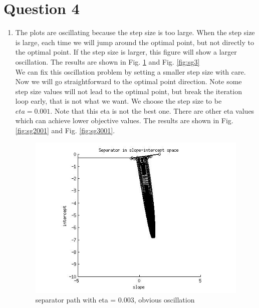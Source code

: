 \documentclass[paper=a4, fontsize=15pt]{article} %
\begin{document}
\section*{Question 4}

\begin{enumerate}
\item The plots are oscillating because the step size is too large. When the step size is large, each time we will jump around the optimal point, but not directly to the optimal point. If the step size is larger, this figure will show a larger oscillation.
The results are shown in Fig. \ref{fig:sg2} and Fig. \ref{fig:sg3}\\
We can fix this oscillation problem by setting a smaller step size with care. Now we will go straightforward to the optimal point direction. 
Note some step size values will not lead to the optimal point, but break the iteration loop early, that is not what we want.
We choose the step size to be $eta = 0.001$. 
Note that this eta is not the best one. There are other eta values which can achieve lower objective values. The results are shown in Fig. \ref{fig:sg2001} and Fig. \ref{fig:sg3001}.
\begin{figure}[hb]
\includegraphics[width=\linewidth]{./a2_datacode/lr/fig2_gd.jpg}
\caption{separator path with eta = 0.003, obvious oscillation}
\label{fig:sg2}
\end{figure}
\begin{figure}[hb]

\end{figure}
\end{enumerate}
\end{document}
